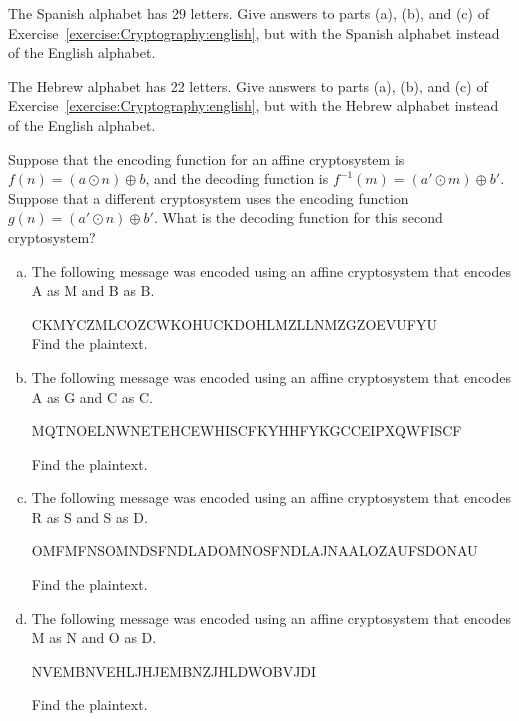 \begin{exercise}{}
The Spanish alphabet has 29 letters. Give answers to parts (a), (b), and (c) of Exercise~\ref{exercise:Cryptography:english}, but with the Spanish alphabet instead of the English alphabet.
\end{exercise}

\begin{exercise}{}
The Hebrew alphabet has  22 letters. Give answers to parts (a), (b), and (c) of Exercise~\ref{exercise:Cryptography:english}, but with the Hebrew alphabet instead of the English alphabet.
\end{exercise}

\begin{exercise}{}
Suppose that the encoding function for an affine cryptosystem is $f(n) = (a \odot n) \oplus  b$, and the decoding function is 
$f^{-1}(m) = (a' \odot m) \oplus  b'$. Suppose that a different cryptosystem uses the encoding function $g(n) = (a' \odot n) \oplus  b'$. What is the decoding function for this second cryptosystem?
\end{exercise}

\begin{exercise}{}
\begin{enumerate}[(a)]
\item
The following message was encoded using an affine cryptosystem that encodes A as M and B as B. 
\medskip

CKMYCZMLCOZCWKOHUCKDOHLMZLLNMZGZOEVUFYU\\

\noindent
Find the plaintext.
\item
The following message was encoded using an affine cryptosystem that encodes A as G and C as C.
\medskip

MQTNOELNWNETEHCEWHISCFKYHHFYKGCCEIPXQWFISCF

\noindent
Find the plaintext.
\item
The following message was encoded using an affine cryptosystem that encodes R as S and S as D.
\medskip

OMFMFNSOMNDSFNDLADOMNOSFNDLAJNAALOZAUFSDONAU

\noindent
Find the plaintext.

\item
The following message was encoded using an affine cryptosystem that encodes M as N and O as D.
\medskip

NVEMBNVEHLJHJEMBNZJHLDWOBVJDI

\noindent
Find the plaintext.

\end{enumerate}
\end{exercise}

